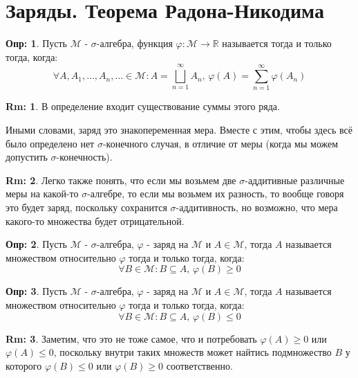\documentclass[12pt]{article}
\newcommand{\MR}{\mathbb{R}}
\newcommand{\MM}{\mathcal{M}}
\theoremstyle{definition}
\newtheorem{defn}{Опр:}
\newtheorem{rem}{Rm:}
\newcommand{\ddsum}[2]{\displaystyle\sum\limits_{#1}^{#2}}
\begin{document}
\section*{Заряды. Теорема Радона-Никодима}
\begin{defn}
	Пусть $\MM$ - $\sigma$-алгебра, функция $\varphi \colon \MM \to \MR$ называется  тогда и только тогда, когда:
	$$
		\forall A, A_1, \dotsc, A_n, \dotsc \in \MM \colon A = \bigsqcup\limits_{n = 1}^{\infty}A_n, \, \varphi(A) = \ddsum{n = 1}{\infty}\varphi(A_n)
	$$
\end{defn}
\begin{rem}
	В определение входит существование суммы этого ряда.
\end{rem}

Иными словами, заряд это знакопеременная мера. Вместе с этим, чтобы здесь всё было определено нет $\sigma$-конечного случая, в отличие от меры (когда мы можем допустить $\sigma$-конечность).

\begin{rem}
	Легко также понять, что если мы возьмем две $\sigma$-аддитивные различные меры на какой-то $\sigma$-алгебре, то если мы возьмем их разность, то вообще говоря это будет заряд, поскольку сохранится $\sigma$-аддитивность, но возможно, что мера какого-то множества будет отрицательной.
\end{rem}

\begin{defn}
	Пусть $\MM$ - $\sigma$-алгебра, $\varphi$ - заряд на $\MM$ и $A \in \MM$, тогда $A$ называется  множеством относительно $\varphi$ тогда и только тогда, когда:
	$$
		\forall B \in \MM \colon B \subseteq A, \, \varphi(B) \geq 0
	$$
\end{defn}
\begin{defn}
	Пусть $\MM$ - $\sigma$-алгебра, $\varphi$ - заряд на $\MM$ и $A \in \MM$, тогда $A$ называется  множеством относительно $\varphi$ тогда и только тогда, когда:
	$$
		\forall B \in \MM \colon B \subseteq A, \,  \varphi(B) \leq 0
	$$
\end{defn}
\begin{rem}
	Заметим, что это не тоже самое, что и потребовать $\varphi(A) \geq 0$ или $\varphi(A) \leq 0$, поскольку внутри таких множеств может найтись подмножество $B$ у которого $\varphi(B) \leq  0$ или $\varphi(B) \geq 0$ соответственно.
\end{rem}
\end{document}
